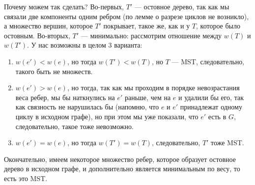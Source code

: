 \begin{solution}
\begin{itemize}
            Почему можем так сделать?
            Во-первых, $T'$ --- остовное дерево, так как мы связали две компоненты одним ребром (по лемме о разрезе циклов не возникло), а множество вершин, которое $T'$ покрывает, такое же, как и у $T$, которое было остовным.
            Во-вторых, $T'$ --- минимально: рассмотрим отношение между $w(T)$ и $w(T')$.
            У нас возможны в целом $3$ варианта:
            \begin{enumerate}
                \item $w(e') < w(e)$, но тогда $w(T') < w(T)$, но $T$ --- MST, следовательно, такого быть не множеств.
                \item $w(e') > w(e)$, но тогда, так как мы проходим в порядке невозрастания веса ребер, мы бы наткнулись на $e'$ раньше, чем на $e$ и удалили бы его, так как связность не нарушилась бы (напомню, что $e$ и $e'$ принадлежат одному циклу в исходном графе), но при этом мы уже показали, что $e'$ есть в $G$, следовательно, такое тоже невозможно.
                \item $w(e') = w(e)$, но тогда $w(T') = w(T)$, следовательно, $T'$ тоже MST.
             \end{enumerate}
        \end{itemize}
        Окончательно, имеем некоторое множество ребер, которое образует остовное дерево в исходном графе, и дополнительно является минимальным по весу, то есть это MST.
\end{solution}